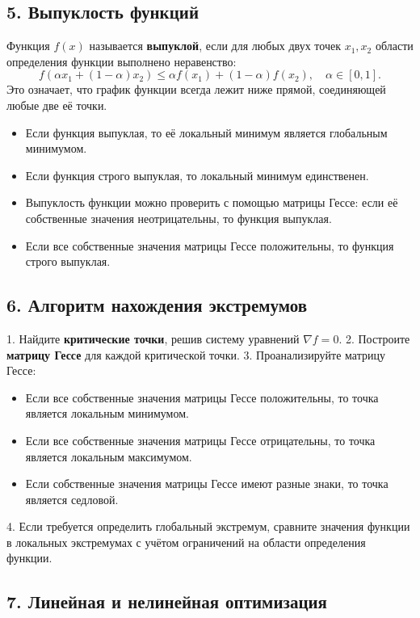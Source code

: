 \documentclass[a4paper,12pt]{article}
\begin{document}
\subsection*{5. Выпуклость функций}

Функция \( f(x) \) называется \textbf{выпуклой}, если для любых двух точек \( x_1, x_2 \) области определения функции выполнено неравенство:
\[
f(\alpha x_1 + (1-\alpha)x_2) \leq \alpha f(x_1) + (1-\alpha) f(x_2), \quad \alpha \in [0, 1].
\]
Это означает, что график функции всегда лежит ниже прямой, соединяющей любые две её точки.

\begin{itemize}
    \item Если функция выпуклая, то её локальный минимум является глобальным минимумом.
    \item Если функция строго выпуклая, то локальный минимум единственен.
    \item Выпуклость функции можно проверить с помощью матрицы Гессе: если её собственные значения неотрицательны, то функция выпуклая.
    \item Если все собственные значения матрицы Гессе положительны, то функция строго выпуклая.
\end{itemize}

\subsection*{6. Алгоритм нахождения экстремумов}

1. Найдите \textbf{критические точки}, решив систему уравнений \( \nabla f = 0 \).
2. Построите \textbf{матрицу Гессе} для каждой критической точки.
3. Проанализируйте матрицу Гессе:
    \begin{itemize}
        \item Если все собственные значения матрицы Гессе положительны, то точка является локальным минимумом.
        \item Если все собственные значения матрицы Гессе отрицательны, то точка является локальным максимумом.
        \item Если собственные значения матрицы Гессе имеют разные знаки, то точка является седловой.
    \end{itemize}
4. Если требуется определить глобальный экстремум, сравните значения функции в локальных экстремумах с учётом ограничений на области определения функции.

\subsection*{7. Линейная и нелинейная оптимизация}
\end{document}

